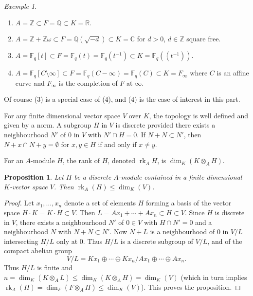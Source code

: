 \documentclass[12pt,a4paper]{article}
\theoremstyle{plain}
\newtheorem{proposition}{Proposition}[section]
\theoremstyle{definition}
\theoremstyle{remark}
\newtheorem{example}{Exemple}[section]
\newcommand{\bF}{\mathbb{F}}
\newcommand{\bQ}{\mathbb{Q}}
\newcommand{\bC}{\mathbb{C}}
\newcommand{\bZ}{\mathbb{Z}}
\newcommand{\bR}{\mathbb{R}}
\providecommand{\rk}{\operatorname{rk}}
\begin{document}
\begin{example}
\label{ex:discrete}
\begin{enumerate}[label=(\arabic*)]
\item $A = \bZ \subset F = \bQ \subset K = \bR$.
\item $A = \bZ + \bZ\omega \subset F = \bQ(\sqrt{-d}) \subset K = \bC$ for $d > 0$, $d \in \bZ$ square free.
\item $A = \bF_q[t] \subset F = \bF_q(t) = \bF_q(t^{-1}) \subset K = \bF_q((t^{-1}))$.
\item $A = \bF_q[C \setminus \infty] \subset F = \bF_q(C - \infty) = \bF_q(C) \subset K = F_\infty$ where $C$ is an affine curve and $F_\infty$ is the completion of $F$ at $\infty$.
\end{enumerate}
Of course (3) is a special case of (4), and (4) is the case of interest in this part.
\end{example}

For any finite dimensional vector space $V$ over $K$, the topology is well defined and given by a norm. A subgroup $H$ in $V$ is discrete provided there exists a neighbourhood $N'$ of $0$ in $V$ with $N' \cap H = 0$. If $N + N \subset N'$, then $N + x \cap N + y = \emptyset$ for $x, y \in H$ if and only if $x \neq y$.

For an $A$-module $H$, the rank of $H$, denoted $\rk_A H$, is $\dim_K(K \otimes_A H)$.

\begin{proposition}
\label{prop:rank}
Let $H$ be a discrete $A$-module contained in a finite dimensional $K$-vector space $V$. Then $\rk_A(H) \leq \dim_K(V)$.
\end{proposition}

\begin{proof}
Let $x_1, \ldots, x_n$ denote a set of elements $H$ forming a basis of the vector space $H \cdot K = K \cdot H \subset V$. Then $L = Ax_1 + \cdots + Ax_n \subset H \subset V$. Since $H$ is discrete in $V$, there exists a neighbourhood $N'$ of $0 \in V$ with $H \cap N' = 0$ and a neighbourhood $N$ with $N + N \subset N'$. Now $N + L$ is a neighbourhood of $0$ in $V/L$ intersecting $H/L$ only at $0$. Thus $H/L$ is a discrete subgroup of $V/L$, and of the compact abelian group
\[
V/L = Kx_1 \oplus \cdots \oplus Kx_n / Ax_1 \oplus \cdots \oplus Ax_n.
\]
Thus $H/L$ is finite and $n = \dim_K(K \otimes_A L) \leq \dim_K(K \otimes_A H) = \dim_K(V)$ (which in turn implies $\rk_A(H) = \dim_F(F \otimes_A H) \leq \dim_K(V)$). This proves the proposition.
\end{proof}
\end{document}
